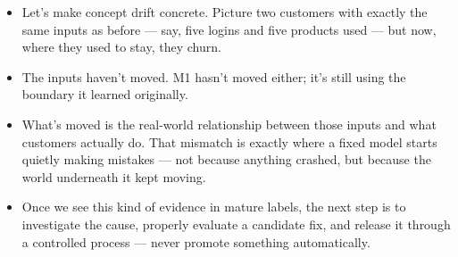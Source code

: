 \documentclass[11pt,a4paper]{article}
\begin{document}
\begin{examplebox}[title after break={SPOKEN SCRIPT --- slide 20 continued}]
\begin{itemize}
\item Let's make concept drift concrete. Picture two customers with exactly the same inputs as before — say, five logins and five products used — but now, where they used to stay, they churn.
\item The inputs haven't moved. M1 hasn't moved either; it's still using the boundary it learned originally.
\item What's moved is the real-world relationship between those inputs and what customers actually do. That mismatch is exactly where a fixed model starts quietly making mistakes — not because anything crashed, but because the world underneath it kept moving.
\item Once we see this kind of evidence in mature labels, the next step is to investigate the cause, properly evaluate a candidate fix, and release it through a controlled process — never promote something automatically.
\end{itemize}
\end{examplebox}
\par\noindent{\scriptsize\textcolor{teal!60!black}{Reading anchor: Bass, Ch. 11 / §14.1.5 · Invented mature cohorts and deliberately simplified decision rule}}
\clearpage
\end{document}
